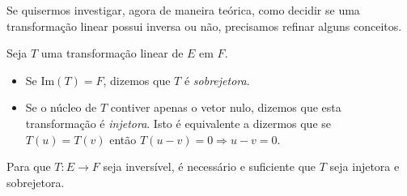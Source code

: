Se quisermos investigar, agora de maneira teórica, como decidir se uma transformação linear possui inversa ou não, precisamos refinar alguns conceitos. 

\begin{defi}
   Seja $T$ uma transformação linear de $E$ em $F$. 
   \begin{itemize}
      \item Se Im$(T)=F$, dizemos que $T$ é \emph{sobrejetora}. 
      \item Se o núcleo de $T$ contiver apenas o vetor nulo, dizemos que esta transformação é \emph{injetora}. Isto é equivalente a dizermos que se $T(u)=T(v)$ então $T(u-v)=0 \Rightarrow u-v=0$. 
   \end{itemize}
\end{defi}

\begin{teo}
   Para que $T:E\to F$ seja inversível, é necessário e suficiente que $T$ seja injetora e sobrejetora.
\end{teo}

